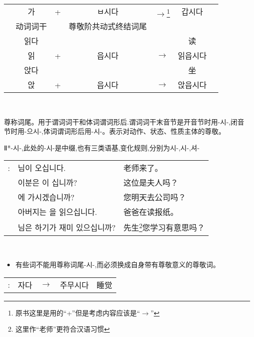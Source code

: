 \begin{grammar}
\begin{grammarsect}[\kr -(으){}ㅂ시다]
\begin{tabular}{ccccccc}
            &\kr 가&+&\kr ㅂ시다&$\to$\footnote{原书这里是用的``+''但是考虑内容应该是``$\to$''}&\kr 갑시다\\\cline{2-2}\cline{4-4}
            &动词词干&&尊敬阶共动式终结词尾\\
            &\kr 읽다 &&&&读\\
            &\kr 읽 &+&\kr 읍시다&$\to$&\kr  읽읍시다\\
            &\kr 앉다 &&&&坐\\
            &\kr 앉 &+&\kr 읍시다&$\to$&\kr 앉읍시다
        \end{tabular}\\
    \end{grammarsect}
\end{grammar}
\begin{grammar}
    \begin{grammarsect}[\kr -(으){}시-]\label{gram:si}
        \begin{itemize}
            \item 尊称词尾。用于谓词词干和体词谓词形后.谓词词干末音节是开音节时用{\kr -시-},闭音节时用{\kr -으시-},体词谓词形后用{\kr -시-}。表示对动作、状态、性质主体的尊敬。
            {\color{gray} \item Ⅱ*{\kr -시-},此处的{\kr -시-}是中缀,也有三类语基,变化规则,分别为{\kr 시-,시-,셔-}}
        \end{itemize}
        \begin{tabular}{lll}
            \kr \ruby{例}{예}: &\kr \ruby{先生}{선생}님이 오십니다.&老师来了。\\
            &\kr 이분은 \ruby{夫人}{부인}이 십니까?&这位是夫人吗？\\ 
            &\kr \ruby{來日}{내일} \ruby{會社}{회사}에 가시겠습니까?&您明天去公司吗？\\
            &\kr 아버지는 \ruby{新聞}{신문}을 읽으십니다.&爸爸在读报纸。\\
            &\kr \ruby{先生}{선생}님은 \ruby{工夫}{공부}하기가 재미 있으십니까?&先生\footnote{这里作“老师”更符合汉语习惯}您学习有意思吗？
        \end{tabular}\\
        \begin{itemize}
            \item 有些词不能用尊称词尾{\kr -시-},而必须换成自身带有尊敬意义的尊敬词。
        \end{itemize}
        \begin{tabular}{lllll}
            \kr \ruby{例}{예}: &\kr 자다&$\to$&\kr 주무시다&睡觉\\

\end{tabular}
\end{grammarsect}
\end{grammar}
